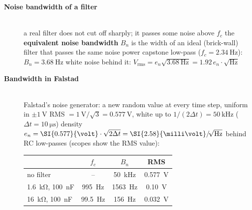 \begin{description}
\item[{\rot\bf Noise bandwidth of a filter}]~\\[-\lblskip]
\bi
	\ite a real filter does not cut off sharply; it passes some noise above $f_c$
	\ite the \textbf{equivalent noise bandwidth} $B_n$ is the width of an ideal (brick-wall) filter that passes the same noise power
\ei
{}
\bi
	\ite capstone low-pass ($f_c = \SI{2.34}{\hertz}$): $B_n = \SI{3.68}{\hertz}$
	\ite white noise behind it: $V_\mathrm{rms} = e_n\sqrt{\SI{3.68}{\hertz}} = 1.92\,e_n\cdot\sqrt{\mathrm{Hz}}$
\ei
\os{\newpage}

\item[{\rot\bf Bandwidth in Falstad}]~\\[-\lblskip]
\bi
	\ite Falstad's noise generator: a new random value at every time step, uniform in $\pm\SI{1}{\volt}$
	\itee RMS $= \SI{1}{\volt}/\sqrt3 = \SI{0.577}{\volt}$, white up to $1/(2\Delta t) = \SI{50}{\kilo\hertz}$ ($\Delta t = \SI{10}{\micro\second}$)
	\itee density $e_n = \SI{0.577}{\volt}\cdot\sqrt{2\Delta t} = \SI{2.58}{\milli\volt}\rtHz$
	\ite behind RC low-passes (scopes show the RMS value):
\ei
\begin{center}
\begin{tabular}{lccc}
\toprule
 & $f_c$ & $B_n$ & RMS \\
\midrule
no filter & -- & \SI{50}{\kilo\hertz} & \SI{0.577}{\volt} \\
\SI{1.6}{\kilo\ohm}, \SI{100}{\nano\farad} & \SI{995}{\hertz} & \SI{1563}{\hertz} & \SI{0.10}{\volt} \\
\SI{16}{\kilo\ohm}, \SI{100}{\nano\farad} & \SI{99.5}{\hertz} & \SI{156}{\hertz} & \SI{0.032}{\volt} \\
\bottomrule
\end{tabular}
\end{center}
\par
{}
\os{\newpage}


\end{description}
